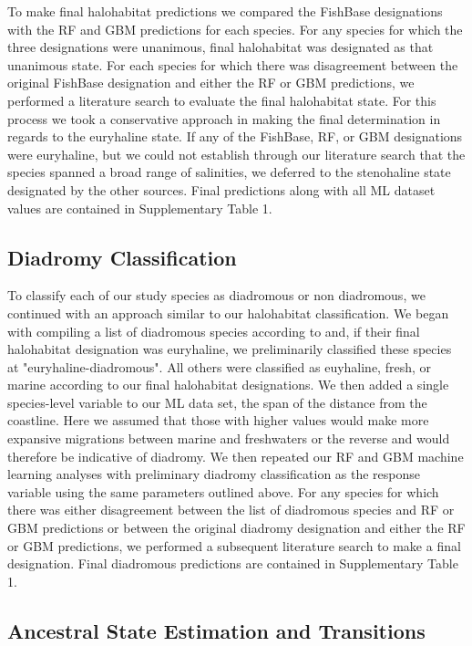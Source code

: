 \documentclass[11pt]{article}
\begin{document}
To make final halohabitat predictions we compared the FishBase designations with the RF and GBM predictions for each species. For any species for which the three designations were unanimous, final halohabitat was designated as that unanimous state. For each species for which there was disagreement between the original FishBase designation and either the RF or GBM predictions, we performed a literature search to evaluate the final halohabitat state. For this process we took a conservative approach in making the final determination in regards to the euryhaline state. If any of the FishBase, RF, or GBM designations were euryhaline, but we could not establish through our literature search that the species spanned a broad range of salinities, we deferred to the stenohaline state designated by the other sources. Final predictions along with all ML dataset values are contained in Supplementary Table 1.

\subsection*{Diadromy Classification}

To classify each of our study species as diadromous or non diadromous, we continued with an approach similar to our halohabitat classification. We began with compiling a list of diadromous species according to \cite{corush2019evolutionary} and, if their final halohabitat designation was euryhaline, we preliminarily classified these species at "euryhaline-diadromous". All others were classified as euyhaline, fresh, or marine according to our final halohabitat designations. We then added a single species-level variable to our ML data set, the span of the distance from the coastline. Here we assumed that those with higher values would make more expansive migrations between marine and freshwaters or the reverse and would therefore be indicative of diadromy. We then repeated our RF and GBM machine learning analyses with preliminary diadromy classification as the response variable using the same parameters outlined above.  For any species for which there was either disagreement between the \cite{corush2019evolutionary} list of diadromous species and RF or GBM predictions or between the original diadromy designation and either the RF or GBM predictions, we performed a subsequent literature search to make a final designation.  Final diadromous predictions are contained in Supplementary Table 1.


\subsection*{Ancestral State Estimation and Transitions }
\end{document}
